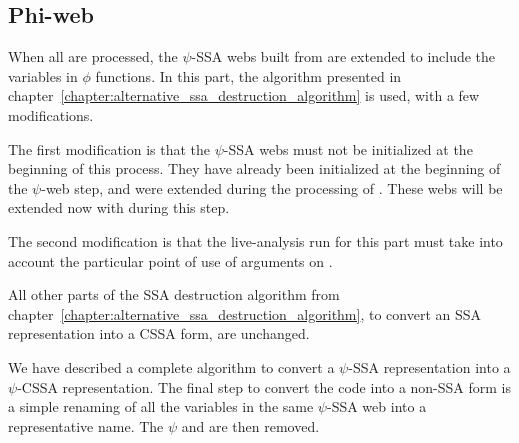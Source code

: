 \subsection{Phi-web}

When all \psifuns are processed, the $\psi$-SSA webs built
from \psifuns are extended to include the variables in $\phi$
functions. In this part, the algorithm presented in
chapter~\ref{chapter:alternative_ssa_destruction_algorithm} is used, with a few
modifications.

The first modification is that the $\psi$-SSA webs must not be
initialized at the beginning of this process. They have already been
initialized at the beginning of the $\psi$-web step, and were extended
during the processing of \psifuns. These webs will be extended
now with \phifuns during this step.

The second modification is that the live-analysis run for this part
must take into account the particular point of use of arguments on
\psifuns.

All other parts of the SSA destruction algorithm from
chapter~\ref{chapter:alternative_ssa_destruction_algorithm}, to convert an SSA
representation into a CSSA form, are unchanged.

We have described a complete algorithm to convert a $\psi$-SSA
representation into a $\psi$-CSSA representation. The final step to
convert the code into a non-SSA form is a simple renaming of all the
variables in the same $\psi$-SSA web into a representative name. The
$\psi$ and \phifuns are then removed.






